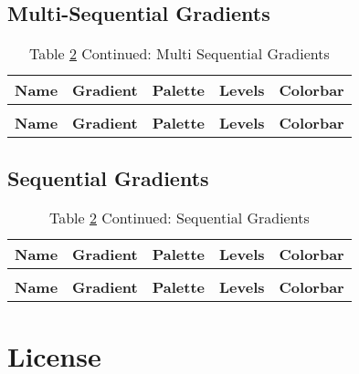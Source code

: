 \documentclass[a4paper]{article}
\begin{document}
\subsection{Multi-Sequential Gradients}
\renewcommand{\arraystretch}{2}
\begin{longtable}{p{}p{}p{}p{}p{}}
	\caption{Multi-Sequential Gradients} \label{tab:msq}                                       \\
	\hline
	\textbf{Name} & \textbf{Gradient} & \textbf{Palette} & \textbf{Levels} & \textbf{Colorbar} \\ \hline \endfirsthead
	\caption*{Table \ref{tab:seq} Continued: Multi Sequential Gradients}                       \\
	\hline
	\textbf{Name} & \textbf{Gradient} & \textbf{Palette} & \textbf{Levels} & \textbf{Colorbar} \\ \hline \endhead
	
\end{longtable}
\newpage
\subsection{Sequential Gradients}
\renewcommand{\arraystretch}{2}
\begin{longtable}{p{}p{}p{}p{}p{}}
	\caption{Sequential Gradients} \label{tab:seq}                                             \\
	\hline
	\textbf{Name} & \textbf{Gradient} & \textbf{Palette} & \textbf{Levels} & \textbf{Colorbar} \\ \hline \endfirsthead
	\caption*{Table \ref{tab:seq} Continued: Sequential Gradients}                             \\
	\hline
	\textbf{Name} & \textbf{Gradient} & \textbf{Palette} & \textbf{Levels} & \textbf{Colorbar} \\ \hline \endhead
	
\end{longtable}
\newpage
\section{License}

\newpage


\end{document}
